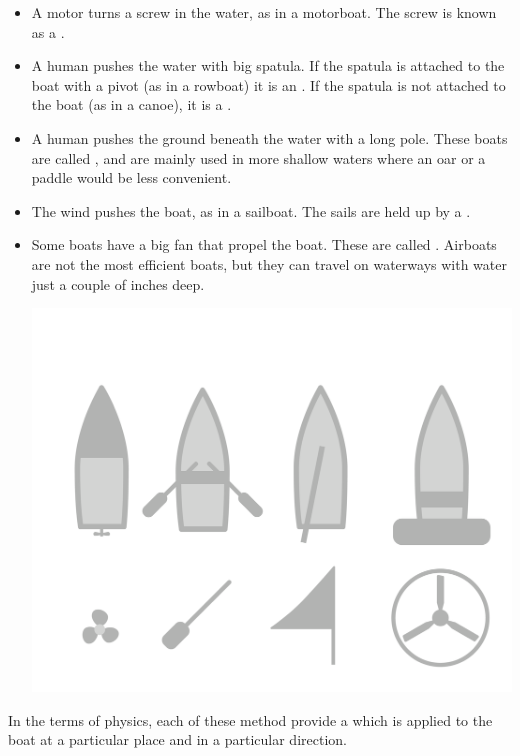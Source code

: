 \begin{itemize}


\item A motor turns a screw in the water, as in a motorboat. The screw is known as a . 

\item A human pushes the water with big spatula.  If the spatula is attached to the boat with a pivot (as in a rowboat) it is an .  If the spatula is not attached to the boat (as in a canoe), it is a .

\item A human pushes the ground beneath the water with a long pole. These boats are called , and are mainly used in more shallow waters where an oar or a paddle would be less convenient.

\item The wind pushes the boat,  as in a sailboat. The sails are held up by a .
\item Some boats have a big fan that propel the boat.  These are called .   Airboats are not the most efficient boats,  but they can travel
on waterways with water just a couple of inches deep.

\begin{center}
    \includegraphics[width=.75\textwidth]{boatTypes.png}

\end{center}

\end{itemize}

In the terms of physics, each of these method provide a  which is applied to the boat at a particular place and in a particular direction.

